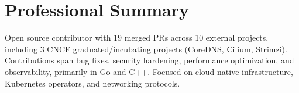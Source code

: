 
\section{Professional Summary}

Open source contributor with 19 merged PRs across 10 external projects, including 3 CNCF
graduated/incubating projects (CoreDNS, Cilium, Strimzi). Contributions span bug fixes,
security hardening, performance optimization, and observability, primarily in Go and C++.
Focused on cloud-native infrastructure, Kubernetes operators, and networking protocols.
